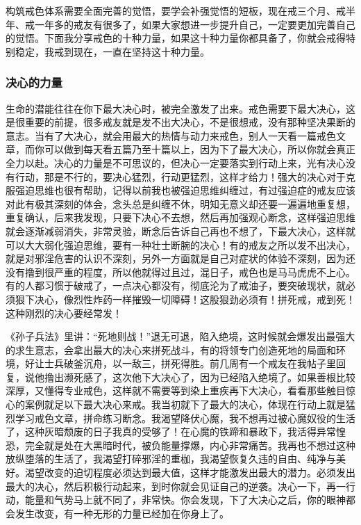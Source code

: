 构筑戒色体系需要全面完善的觉悟，要学会补强觉悟的短板，现在戒三个月、戒半年、戒一年多的戒友有很多了，如果大家想进一步提升自己，一定要更加完善自己的觉悟。下面我分享戒色的十种力量，如果这十种力量你都具备了，你就会戒得特别稳定，我戒到现在，一直在坚持这十种力量。

\subsubsection{决心的力量}

生命的潜能往往在你下最大决心时，被完全激发了出来。戒色需要下最大决心，这是很重要的前提，很多戒友就是发不出大决心，不是很想戒，没有那种坚决果断的意志。当有了大决心，就会用最大的热情与动力来戒色，别人一天看一篇戒色文章，而你可以做到每天看五篇乃至十篇以上，因为下了最大决心，所以你就会真正全力以赴。决心的力量是不可思议的，但决心一定要落实到行动上来，光有决心没有行动，那是不行的，要决心猛烈，行动更猛烈，这样才给力！强大的决心对于克服强迫思维也很有帮助，记得以前我也被强迫思维纠缠过，有过强迫症的戒友应该对此有极其深刻的体会，念头总是纠缠不休，明知无意义却还要一遍遍地重复想，重复确认，后来我发现，只要下决心不去想，然后再加强观心断念，这样强迫思维就会逐渐减弱消失，非常灵验，断念后告诉自己再也不想了，下最大决心，这样就可以大大弱化强迫思维，要有一种壮士断腕的决心！有的戒友之所以发不出决心，就是对邪淫危害的认识不深刻，另外一方面就是自己对症状的体验不深刻，因为还没有撸到很严重的程度，所以他就得过且过，混日子，戒色也是马马虎虎不上心。有的人都习惯于破戒了，一点决心都没有，彻底沦为了戒油子，要突破现状，就必须狠下决心，像烈性炸药一样摧毁一切障碍！这股狠劲必须有！拼死戒，戒到死！这种刚烈的决心要经常发！

《孙子兵法》里讲：“死地则战！”退无可退，陷入绝境，这时候就会爆发出最强大的求生意志，会拿出最大的决心来拼死战斗，有的将领专门创造死地的局面和环境，好让士兵破釜沉舟，以一敌三，拼死得胜。前几周有一个戒友在我帖子里回复，说他撸出濒死感了，这次他下大决心了，因为已经陷入绝境了。如果善根比较深厚，又懂得专业戒色，这样就不需要等到染上重疾再下大决心，看看那些触目惊心的案例就足以下最大决心来戒。我当初就下了最大的决心，体现在行动上就是猛烈学习戒色文章，拼命练习断念。我渴望降伏心魔，我不想再过被心魔奴役的生活了，这种灰暗颓废的日子我真的受够了！在心魔的铁蹄和暴政下，我活得异常惶恐，完全就是处在大黑暗时代，被负能量撑爆，内心非常痛苦。我再也不想过这种放纵堕落的生活了，我渴望打碎邪淫的重枷，我渴望恢复久违的自由、纯净与美好。渴望改变的迫切程度必须达到最大值，这样才能激发出最大的潜力。必须发出最大的决心，然后积极行动起来，到时你就会见证自己的逆袭。决心一下，再一行动，能量和气势马上就不同了，非常快。你会发现，下了大决心之后，你的眼神都会发生改变，有一种无形的力量已经加在你身上了。

